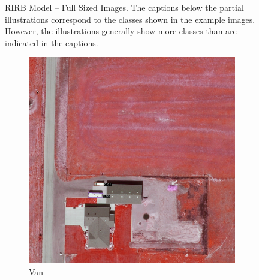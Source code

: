 \begin{figure}[h!]
    \caption[RIRB Model – Full Sized Images]{RIRB Model – Full Sized Images. The captions below the partial illustrations correspond to the classes shown in the example images. However, the illustrations generally show more classes than are indicated in the captions.}
    \label{fig:rirb_perm_exp_examples_fs}
\end{figure}


\begin{figure}[h!]
    \centering
    \begin{subfigure}[t]{0.38\textwidth}
        \centering
        \includegraphics[width=\linewidth]{images/015Results/02perm_exp/comp_images/rgir/198.png}
        \caption{Van}
    \end{subfigure}
    \begin{subfigure}[t]{0.38\textwidth}
        \centering

\end{subfigure}
\end{figure}
